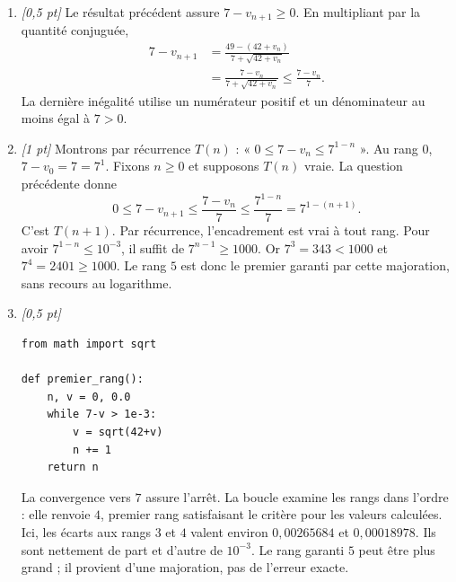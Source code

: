 \begin{enumerate}
\item \textit{[0,5 pt]} Le résultat précédent assure $7-v_{n+1}\ge0$. En multipliant par la quantité conjuguée,
\[\begin{aligned}7-v_{n+1}&=\frac{49-(42+v_n)}{7+\sqrt{42+v_n}}\\&=\frac{7-v_n}{7+\sqrt{42+v_n}}\le\frac{7-v_n}{7}.\end{aligned}\]
La dernière inégalité utilise un numérateur positif et un dénominateur au moins égal à $7>0$.

\item \textit{[1 pt]} Montrons par récurrence $T(n)$ : « $0\le 7-v_n\le 7^{1-n}$ ».
Au rang $0$, $7-v_0=7=7^1$. Fixons $n\ge0$ et supposons $T(n)$ vraie. La question précédente donne
\[0\le 7-v_{n+1}\le\frac{7-v_n}{7}\le\frac{7^{1-n}}{7}=7^{1-(n+1)}.\]
C'est $T(n+1)$. Par récurrence, l'encadrement est vrai à tout rang.
Pour avoir $7^{1-n}\le10^{-3}$, il suffit de $7^{n-1}\ge1000$.
Or $7^{3}=343<1000$ et $7^{4}=2401\ge1000$. Le rang $5$ est donc le premier garanti par cette majoration, sans recours au logarithme.


\item \textit{[0,5 pt]} 
\begin{lstlisting}
from math import sqrt

def premier_rang():
    n, v = 0, 0.0
    while 7-v > 1e-3:
        v = sqrt(42+v)
        n += 1
    return n
\end{lstlisting}
La convergence vers $7$ assure l'arrêt. La boucle examine les rangs dans l'ordre : elle renvoie $4$, premier rang satisfaisant le critère pour les valeurs calculées. Ici, les écarts aux rangs $3$ et $4$ valent environ $0{,}00265684$ et $0{,}00018978$. Ils sont nettement de part et d'autre de $10^{-3}$. Le rang garanti $5$ peut être plus grand ; il provient d'une majoration, pas de l'erreur exacte.

\end{enumerate}

